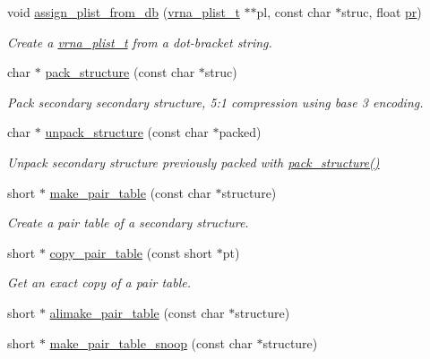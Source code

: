 \begin{DoxyCompactItemize}
void \hyperlink{group__struct__utils_ga6f3031d77de925a7b4ca72e1d52dec2f}{assign\+\_\+plist\+\_\+from\+\_\+db} (\hyperlink{group__data__structures_ga8e4eb5e1bfc95776559575beb359af87}{vrna\+\_\+plist\+\_\+t} $\ast$$\ast$pl, const char $\ast$struc, float \hyperlink{fold__vars_8h_ac98ec419070aee6831b44e5c700f090f}{pr})
\begin{DoxyCompactList}\small\item\em Create a \hyperlink{group__data__structures_ga8e4eb5e1bfc95776559575beb359af87}{vrna\+\_\+plist\+\_\+t} from a dot-\/bracket string. \end{DoxyCompactList}\item 
char $\ast$ \hyperlink{group__struct__utils_gac6dfa5e22928c087c6e09ff0054a7ced}{pack\+\_\+structure} (const char $\ast$struc)
\begin{DoxyCompactList}\small\item\em Pack secondary secondary structure, 5\+:1 compression using base 3 encoding. \end{DoxyCompactList}\item 
char $\ast$ \hyperlink{group__struct__utils_ga071c6921efe1eb974f115ee6fefa3c39}{unpack\+\_\+structure} (const char $\ast$packed)
\begin{DoxyCompactList}\small\item\em Unpack secondary structure previously packed with \hyperlink{group__struct__utils_gac6dfa5e22928c087c6e09ff0054a7ced}{pack\+\_\+structure()} \end{DoxyCompactList}\item 
short $\ast$ \hyperlink{group__struct__utils_ga89c32307ee50a0026f4a3131fac0845a}{make\+\_\+pair\+\_\+table} (const char $\ast$structure)
\begin{DoxyCompactList}\small\item\em Create a pair table of a secondary structure. \end{DoxyCompactList}\item 
short $\ast$ \hyperlink{group__struct__utils_gafeaa6d68eef3a99d0a7aa08aa91c6601}{copy\+\_\+pair\+\_\+table} (const short $\ast$pt)
\begin{DoxyCompactList}\small\item\em Get an exact copy of a pair table. \end{DoxyCompactList}\item 
short $\ast$ \hyperlink{group__struct__utils_ga3c81b3967056c3888b8472b65fbb16f5}{alimake\+\_\+pair\+\_\+table} (const char $\ast$structure)
\item 
short $\ast$ \hyperlink{group__struct__utils_ga9aa3bf3b4346bb7fb88efc154dd07a79}{make\+\_\+pair\+\_\+table\+\_\+snoop} (const char $\ast$structure)
$$
\end{DoxyCompactItemize}
